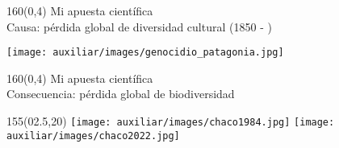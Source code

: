 \documentclass[shownotes,aspectratio=169]{beamer}
\begin{document}
\begin{frame}[plain]
\begin{textblock}{160}(0,4)
 \centering \LARGE Mi apuesta científica \\
 \Large Causa: pérdida global de diversidad cultural (1850 - )
 \end{textblock}
\vspace{1.25cm} \centering

\texttt{[image: auxiliar/images/genocidio\_patagonia.jpg]}


\end{frame}


\begin{frame}[plain]
\begin{textblock}{160}(0,4)
 \centering \LARGE Mi apuesta científica \\
 \Large Consecuencia: pérdida global de biodiversidad 
 \end{textblock}
\vspace{1.25cm} \centering


\begin{textblock}{155}(02.5,20)
 \centering
\texttt{[image: auxiliar/images/chaco1984.jpg]}
\texttt{[image: auxiliar/images/chaco2022.jpg]}
\end{textblock}

\end{frame}
% 
% 
% 
% 
% 
\end{document}
